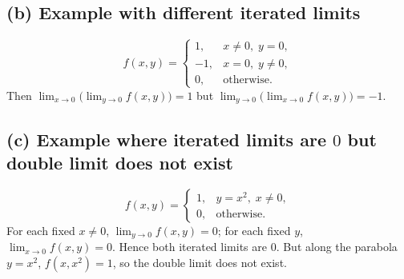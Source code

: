 \documentclass{article}
\begin{document}
\subsection*{(b) Example with different iterated limits}
\[
	f(x,y)=\begin{cases}
		1,  & x\neq0,\;y=0,     \\
		-1, & x=0,\;y\neq0,     \\
		0,  & \text{otherwise}.
	\end{cases}
\]
Then $\lim_{x\to0}\bigl(\lim_{y\to0}f(x,y)\bigr)=1$ but $\lim_{y\to0}\bigl(\lim_{x\to0}f(x,y)\bigr)=-1$.

\subsection*{(c) Example where iterated limits are $0$ but double limit does not exist}
\[
	f(x,y)=\begin{cases}
		1, & y=x^2,\;x\neq0,   \\
		0, & \text{otherwise}.
	\end{cases}
\]
For each fixed $x\neq0$, $\lim_{y\to0}f(x,y)=0$; for each fixed $y$, $\lim_{x\to0}f(x,y)=0$. Hence both iterated limits are $0$. But along the parabola $y=x^2$, $f(x,x^2)=1$, so the double limit does not exist.
\end{document}
